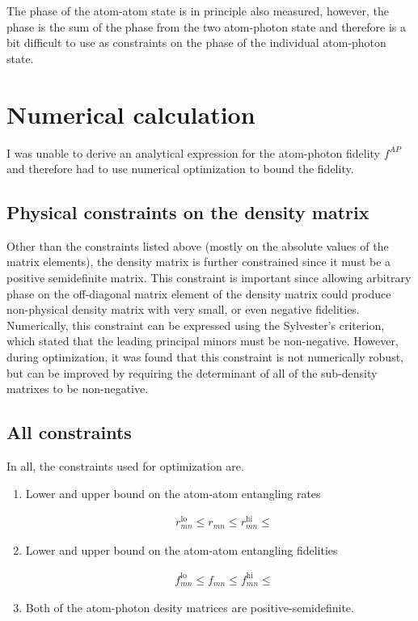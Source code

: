 \documentclass[10pt,fleqn]{article}
\newcommand{\eqar}[1]
{
  \begin{align}
    #1
  \end{align}
}
\begin{document}
The phase of the atom-atom state is in principle also measured, however, the phase is the sum of the phase from the two atom-photon state and therefore is a bit difficult to use as constraints on the phase of the individual atom-photon state.

\section{Numerical calculation}
I was unable to derive an analytical expression for the atom-photon fidelity $f^{AP}$ and therefore had to use numerical optimization to bound the fidelity.

\subsection{Physical constraints on the density matrix}
Other than the constraints listed above (mostly on the absolute values of the matrix elements), the density matrix is further constrained since it must be a positive semidefinite matrix.
This constraint is important since allowing arbitrary phase on the off-diagonal matrix element of the density matrix could produce non-physical density matrix with very small, or even negative fidelities.
Numerically, this constraint can be expressed using the Sylvester's criterion, which stated that the leading principal minors must be non-negative.
However, during optimization, it was found that this constraint is not numerically robust, but can be improved by requiring the determinant of all of the sub-density matrixes to be non-negative.

\subsection{All constraints}
In all, the constraints used for optimization are.

\begin{enumerate}
\item Lower and upper bound on the atom-atom entangling rates
  \eqar{
    &r_{mn}^{\mathrm{lo}}\leqslant r_{mn} \leqslant r_{mn}^{\mathrm{hi}}\leqslant
  }
\item Lower and upper bound on the atom-atom entangling fidelities
  \eqar{
    &f_{mn}^{\mathrm{lo}}\leqslant f_{mn} \leqslant f_{mn}^{\mathrm{hi}}\leqslant
  }
\item Both of the atom-photon desity matrices are positive-semidefinite.
\end{enumerate}
\end{document}
